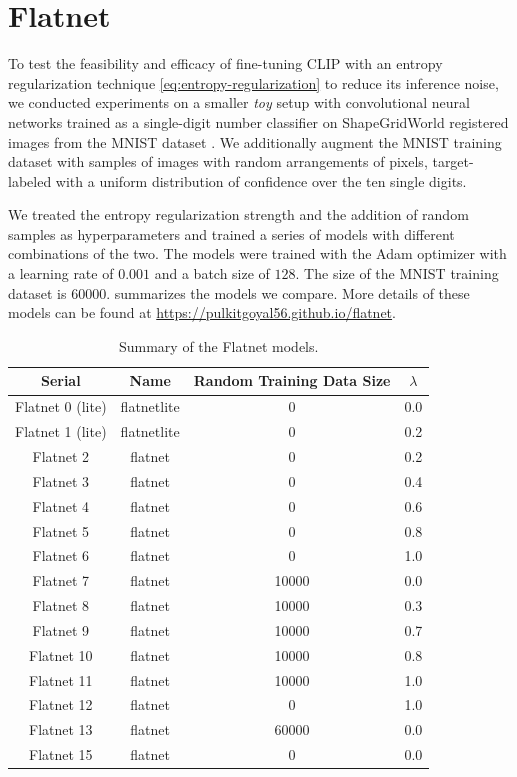 \chapter{Flatnet}
\label{sec:flatnet}
To test the feasibility and efficacy of fine-tuning CLIP with an entropy regularization technique \eqref{eq:entropy-regularization} to reduce its inference noise, we conducted experiments on a smaller \emph{toy} setup with convolutional neural networks trained as a single-digit number classifier on ShapeGridWorld registered images from the MNIST dataset \citep{mnist}.
We additionally augment the MNIST training dataset with samples of images with random arrangements of pixels, target-labeled with a uniform distribution of confidence over the ten single digits.

We treated the entropy regularization strength and the addition of random samples as hyperparameters and trained a series of models with different combinations of the two.
The models were trained with the Adam optimizer \citep{adam} with a learning rate of \(0.001\) and a batch size of \(128\). The size of the MNIST training dataset is \(60000\).
 summarizes the models we compare.
More details of these models can be found at \url{https://pulkitgoyal56.github.io/flatnet}.

\begin{table}[H]
    \centering
    \caption{Summary of the Flatnet models.}
    \begin{tabularx}{0.7\textwidth}{c c c c}
    \hline
        Serial & Name & Random Training Data Size & \(\lambda\) \\ \hline
        Flatnet 0 (lite) & flatnetlite & 0 & 0.0 \\ \hline
        Flatnet 1 (lite) & flatnetlite & 0 & 0.2 \\ \hline
        Flatnet 2 & flatnet & 0 & 0.2 \\ \hline
        Flatnet 3 & flatnet & 0 & 0.4 \\ \hline
        Flatnet 4 & flatnet & 0 & 0.6 \\ \hline
        Flatnet 5 & flatnet & 0 & 0.8 \\ \hline
        Flatnet 6 & flatnet & 0 & 1.0 \\ \hline
        Flatnet 7 & flatnet & 10000 & 0.0 \\ \hline
        Flatnet 8 & flatnet & 10000 & 0.3 \\ \hline
        Flatnet 9 & flatnet & 10000 & 0.7 \\ \hline
        Flatnet 10 & flatnet & 10000 & 0.8 \\ \hline
        Flatnet 11 & flatnet & 10000 & 1.0 \\ \hline
        Flatnet 12 & flatnet & 0 & 1.0 \\ \hline
        Flatnet 13 & flatnet & 60000 & 0.0 \\ \hline
        Flatnet 15 & flatnet & 0 & 0.0 \\ \hline
    \end{tabularx}
    \label{tab:flatnet-models}
\end{table}

